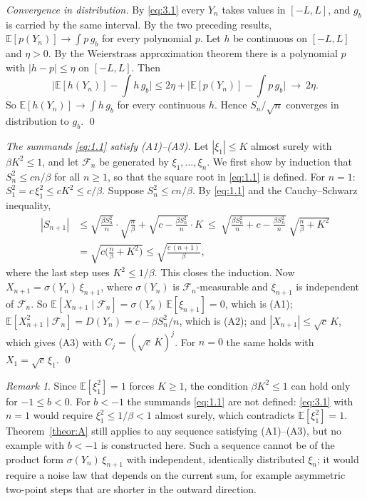 \documentclass[aip,jmp,preprint,onecolumn,floatfix,superscriptaddress,nofootinbib,11pt]{revtex4-2}
\theoremstyle{plain}
\theoremstyle{remark}
\newtheorem*{remark}{Remark}
\numberwithin{equation}{section}
\newcommand{\E}{\mathbb{E}}
\begin{document}
\textit{Convergence in distribution.} By \eqref{eq:3.1} every $Y_n$ takes values in $[-L,L]$, and $g_b$ is carried by the same interval. By the two preceding results, $\E[p(Y_n)]\to\int p\,g_b$ for every polynomial $p$. Let $h$ be continuous on $[-L,L]$ and $\eta>0$. By the Weierstrass approximation theorem there is a polynomial $p$ with $|h-p|\le\eta$ on $[-L,L]$. Then
%
\begin{equation*}
\Big|\E[h(Y_n)]-\int h\,g_b\Big|\le 2\eta+\Big|\E[p(Y_n)]-\int p\,g_b\Big|\ \longrightarrow\ 2\eta .
\end{equation*}
%
So $\E[h(Y_n)]\to\int h\,g_b$ for every continuous $h$. Hence $S_n/\sqrt n$ converges in distribution to $g_b$. \qed
 
\textit{The summands \eqref{eq:1.1} satisfy (A1)--(A3).} Let $|\xi_1|\le K$ almost surely with $\beta K^{2}\le1$, and let $\mathcal F_n$ be generated by $\xi_1,\dots,\xi_n$. We first show by induction that $S_n^{2}\le cn/\beta$ for all $n\ge1$, so that the square root in \eqref{eq:1.1} is defined. For $n=1$: $S_1^{2}=c\,\xi_1^{2}\le cK^{2}\le c/\beta$. Suppose $S_n^{2}\le cn/\beta$. By \eqref{eq:1.1} and the Cauchy--Schwarz inequality,
%
\begin{equation*}
\begin{aligned} |S_{n+1}|&\le \sqrt{\frac{\beta S_n^{2}}{n}}\cdot\sqrt{\frac n\beta}+\sqrt{c-\frac{\beta S_n^{2}}{n}}\cdot K\ \le\ \sqrt{\frac{\beta S_n^{2}}{n}+c-\frac{\beta S_n^{2}}{n}}\;\sqrt{\frac n\beta+K^{2}}\\[4pt] &=\sqrt{c\Big(\frac n\beta+K^{2}\Big)}\le\sqrt{\frac{c\,(n+1)}{\beta}} , \end{aligned}
\end{equation*}
%
where the last step uses $K^{2}\le1/\beta$. This closes the induction. Now $X_{n+1}=\sigma(Y_n)\,\xi_{n+1}$, where $\sigma(Y_n)$ is $\mathcal F_n$-measurable and $\xi_{n+1}$ is independent of $\mathcal F_n$. So $\E[X_{n+1}\mid\mathcal F_n]=\sigma(Y_n)\,\E[\xi_{n+1}]=0$, which is (A1); $\E[X_{n+1}^{2}\mid\mathcal F_n]=D(Y_n)=c-\beta S_n^{2}/n$, which is (A2); and $|X_{n+1}|\le\sqrt c\,K$, which gives (A3) with $C_j=(\sqrt c\,K)^{j}$. For $n=0$ the same holds with $X_1=\sqrt c\,\xi_1$. \qed
 
\begin{remark}
Since $\E[\xi_1^{2}]=1$ forces $K\ge1$, the condition $\beta K^{2}\le1$ can hold only for $-1\le b<0$. For $b<-1$ the summands \eqref{eq:1.1} are not defined: \eqref{eq:3.1} with $n=1$ would require $\xi_1^{2}\le1/\beta<1$ almost surely, which contradicts $\E[\xi_1^{2}]=1$. Theorem~\ref{theor:A} still applies to any sequence satisfying (A1)--(A3), but no example with $b<-1$ is constructed here. Such a sequence cannot be of the product form $\sigma(Y_n)\,\xi_{n+1}$ with independent, identically distributed $\xi_n$; it would require a noise law that depends on the current sum, for example asymmetric two-point steps that are shorter in the outward direction.
\end{remark}
 
\end{document}

